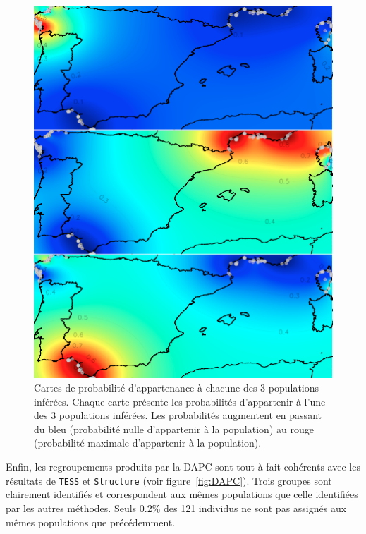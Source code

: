 \documentclass[a4paper,12pt,twoside]{article}\usepackage[]{graphicx}\usepackage[]{color}
\begin{document}
\begin {bibunit} [newbst]
\begin{figure}[htbp]
	\centering
		\includegraphics[width=.9\textwidth]{map_clusters_3}
	\caption[Cartes de probabilité d'appartenance aux populations inférées.]{Cartes de probabilité d'appartenance à chacune des 3 populations inférées. Chaque carte présente les probabilités d'appartenir à l'une des 3 populations inférées. Les probabilités augmentent en passant du bleu (probabilité nulle d'appartenir à la population) au rouge (probabilité maximale d'appartenir à la population).}
	\label{fig:probamap}
\end{figure}

Enfin, les regroupements produits par la DAPC sont tout à fait cohérents avec les résultats de \texttt{TESS} et \texttt{Structure} (voir figure~\ref{fig:DAPC}). Trois groupes sont clairement identifiés et correspondent aux mêmes populations que celle identifiées par les autres méthodes. Seuls 0.2\% des 121 individus ne sont pas assignés aux mêmes populations que précédemment.


\end{bibunit}
\end{document}

